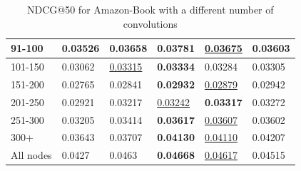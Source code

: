 \begin{table}[]
\begin{tabular}{|l|l|l|l|l|l|}
        91-100    & 0.03526                    & 0.03658                    & \textbf{0.03781}           & \underline{0.03675}        & 0.03603                    \\ \hline
        101-150   & 0.03062                    & \underline{0.03315}        & \textbf{0.03334}           & 0.03284                    & 0.03305                    \\ \hline
        151-200   & 0.02765                    & 0.02841                    & \textbf{0.02932}           & \underline{0.02879}        & 0.02942                    \\ \hline
        201-250   & 0.02921                    & 0.03217                    & \underline{0.03242}        & \textbf{0.03317}           & 0.03272                    \\ \hline
        251-300   & 0.03205                    & 0.03414                    & \textbf{0.03617}           & \underline{0.03607}        & 0.03602                    \\ \hline
        300+      & 0.03643                    & 0.03707                    & \textbf{0.04130}           & \underline{0.04110}        & 0.04207                    \\ \hline
        All nodes & 0.0427                     & 0.0463                     & \textbf{0.04668}           & \underline{0.04617}        & 0.04515                    \\ \hline
    \end{tabular}
    \caption{NDCG@50 for Amazon-Book with a different number of convolutions}
    \label{tab:Amazon-book-ndcg-evaluation-mean}
\end{table}

